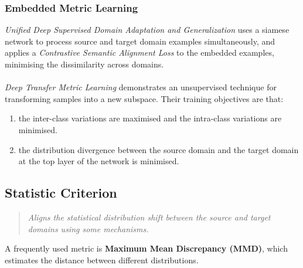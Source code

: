 \documentclass{report}
\newcommand{\quoteit}[1]{\begin{quote}\textit{#1}\end{quote}}
\begin{document}
\subsubsection{Embedded Metric Learning}
\textit{Unified Deep Supervised Domain Adaptation and Generalization}\parencite{unifieddeepadaptation} uses a siamese network to process source and target domain examples simultaneously, and applies a \textit{Contrastive Semantic Alignment Loss} to the embedded examples, minimising the dissimilarity across domains. \\ \\
\textit{Deep Transfer Metric Learning}\parencite{deeptransfermetric} demonstrates an unsupervised technique for transforming samples into a new subspace. Their training objectives are that:
\begin{enumerate}
	\item the inter-class variations are maximised and the intra-class variations are minimised.
	\item the distribution divergence between the source domain and the target domain at the top layer of the network is minimised.
\end{enumerate}






\subsection{Statistic Criterion}
\quoteit{Aligns the statistical distribution shift between the source and target domains using some mechanisms.}
A frequently used metric is \textbf{Maximum Mean Discrepancy (MMD)}, which estimates the distance between different distributions.  \\ \\
\end{document}

